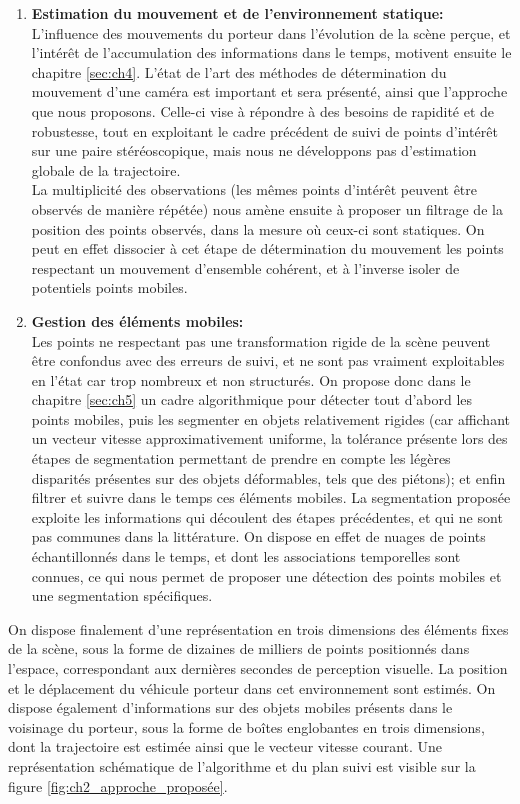 \begin{enumerate}
	\item{\textbf{Estimation du mouvement et de l'environnement statique:}\\}
	L'influence des mouvements du porteur dans l'évolution de la scène perçue, et l'intérêt de l'accumulation des informations dans le temps, motivent ensuite le chapitre \ref{sec:ch4}. L'état de l'art des méthodes de détermination du mouvement d'une caméra est important et sera présenté, ainsi que l'approche que nous proposons. Celle-ci vise à répondre à des besoins de rapidité et de robustesse, tout en exploitant le cadre précédent de suivi de points d'intérêt sur une paire stéréoscopique, mais nous ne développons pas d'estimation globale de la trajectoire. \\
	La multiplicité des observations (les mêmes points d'intérêt peuvent être observés de manière répétée) nous amène ensuite à proposer un filtrage de la position des points observés, dans la mesure où ceux-ci sont statiques. On peut en effet dissocier à cet étape de détermination du mouvement les points respectant un mouvement d'ensemble cohérent, et à l'inverse isoler de potentiels points mobiles.\\
	
	\item{\textbf{Gestion des éléments mobiles:}\\}
	Les points ne respectant pas une transformation rigide de la scène peuvent être confondus avec des erreurs de suivi, et ne sont pas vraiment exploitables en l'état car trop nombreux et non structurés. On propose donc dans le chapitre \ref{sec:ch5} un cadre algorithmique pour détecter tout d'abord les points mobiles, puis les segmenter en objets relativement rigides (car affichant un vecteur vitesse approximativement uniforme, la tolérance présente lors des étapes de segmentation permettant de prendre en compte les légères disparités présentes sur des objets déformables, tels que des piétons); et enfin filtrer et suivre dans le temps ces éléments mobiles. La segmentation proposée exploite les informations qui découlent des étapes précédentes, et qui ne sont pas communes dans la littérature. On dispose en effet de nuages de points échantillonnés dans le temps, et dont les associations temporelles sont connues, ce qui nous permet de proposer une détection des points mobiles et une segmentation spécifiques.\\	
\end{enumerate}


On dispose finalement d'une représentation en trois dimensions des éléments fixes de la scène, sous la forme de dizaines de milliers de points positionnés dans l'espace, correspondant aux dernières secondes de perception visuelle. La position et le déplacement du véhicule porteur dans cet environnement sont estimés. On dispose également d'informations sur des objets mobiles présents dans le voisinage du porteur, sous la forme de boîtes englobantes en trois dimensions, dont la trajectoire est estimée ainsi que le vecteur vitesse courant. Une représentation schématique de l'algorithme et du plan suivi est visible sur la figure \ref{fig:ch2_approche_proposée}.

